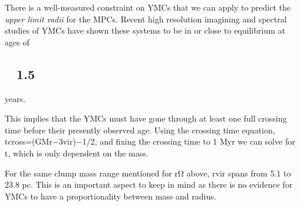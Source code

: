 There is a well-measured constraint on YMCs that we can apply to predict the \textit{upper limit radii} for the MPCs. Recent high resolution imagining and spectral studies of YMCs have shown these systems to be in or close to equilibrium at ages of \subsection{~ 1.5 }
 years. \cite{Darwin_1900}

This implies that the YMCs must have gone through at least one full crossing time before their presently observed age. Using the crossing time equation, tcross=(GMr−3vir)−1/2, and fixing the crossing time to 1 Myr we can solve for t, which is only dependent on the mass. \cite{1999}

For the same clump mass range mentioned for rΩ above, rvir spans from 5.1 to 23.8 pc. This is an important aspect to keep in mind as there is no evidence for YMCs to have a proportionality between mass and radius. \cite{Bedini_2013}